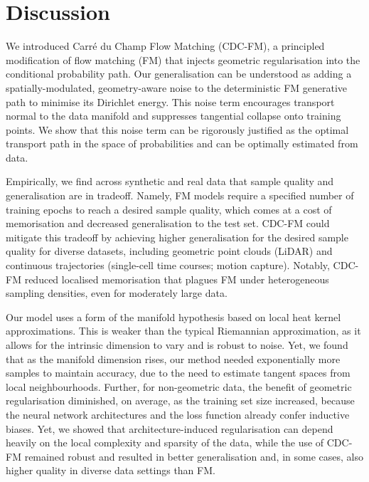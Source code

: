 \documentclass{article} %
\begin{document}
\section{Discussion}

We introduced Carr\'{e} du Champ Flow Matching (CDC‑FM), a principled modification of flow matching (FM) that injects geometric regularisation into the conditional probability path.
Our generalisation can be understood as adding a spatially-modulated, geometry-aware noise to the deterministic FM generative path to minimise its Dirichlet energy.
This noise term encourages transport normal to the data manifold and suppresses tangential collapse onto training points.
We show that this noise term can be rigorously justified as the optimal transport path in the space of probabilities and can be optimally estimated from data.

Empirically, we find across synthetic and real data that sample quality and generalisation are in tradeoff. Namely, FM models require a specified number of training epochs to reach a desired sample quality, which comes at a cost of memorisation and decreased generalisation to the test set.
CDC-FM could mitigate this tradeoff by achieving higher generalisation for the desired sample quality for diverse datasets, including geometric point clouds (LiDAR) and continuous trajectories (single‑cell time courses; motion capture).
Notably, CDC-FM reduced localised memorisation that plagues FM under heterogeneous sampling densities, even for moderately large data.

Our model uses a form of the manifold hypothesis based on local heat kernel approximations. This is weaker than the typical Riemannian approximation, as it allows for the intrinsic dimension to vary and is robust to noise. Yet, we found that as the manifold dimension rises, our method needed exponentially more samples to maintain accuracy, due to the need to estimate tangent spaces from local neighbourhoods.
Further, for non-geometric data, the benefit of geometric regularisation diminished, on average, as the training set size increased, because the neural network architectures and the loss function already confer inductive biases.
Yet, we showed that architecture-induced regularisation can depend heavily on the local complexity and sparsity of the data, while the use of CDC-FM remained robust and resulted in better generalisation and, in some cases, also higher quality in diverse data settings than FM. 
\end{document}
